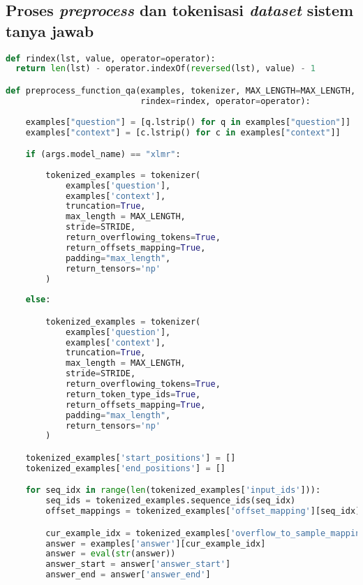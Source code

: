 \subsection{Proses \emph{preprocess} dan tokenisasi \emph{dataset} sistem tanya jawab}
\begin{lstlisting}[language=Python, caption=Proses \emph{preprocess} dan tokenisasi \emph{dataset} sistem tanya jawab]
def rindex(lst, value, operator=operator):
  return len(lst) - operator.indexOf(reversed(lst), value) - 1

def preprocess_function_qa(examples, tokenizer, MAX_LENGTH=MAX_LENGTH, STRIDE=STRIDE, 
                           rindex=rindex, operator=operator):
    
    examples["question"] = [q.lstrip() for q in examples["question"]]
    examples["context"] = [c.lstrip() for c in examples["context"]]

    if (args.model_name) == "xlmr":
        
        tokenized_examples = tokenizer(
            examples['question'],
            examples['context'],
            truncation=True,
            max_length = MAX_LENGTH,
            stride=STRIDE,
            return_overflowing_tokens=True,
            return_offsets_mapping=True,
            padding="max_length",
            return_tensors='np'
        )
    
    else:

        tokenized_examples = tokenizer(
            examples['question'],
            examples['context'],
            truncation=True,
            max_length = MAX_LENGTH,
            stride=STRIDE,
            return_overflowing_tokens=True,
            return_token_type_ids=True,
            return_offsets_mapping=True,
            padding="max_length",
            return_tensors='np'
        )

    tokenized_examples['start_positions'] = []
    tokenized_examples['end_positions'] = []

    for seq_idx in range(len(tokenized_examples['input_ids'])):
        seq_ids = tokenized_examples.sequence_ids(seq_idx)
        offset_mappings = tokenized_examples['offset_mapping'][seq_idx]

        cur_example_idx = tokenized_examples['overflow_to_sample_mapping'][seq_idx]
        answer = examples['answer'][cur_example_idx]
        answer = eval(str(answer))
        answer_start = answer['answer_start']
        answer_end = answer['answer_end']


\end{lstlisting}
